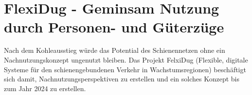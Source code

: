 \section{FlexiDug - Geminsam Nutzung durch Personen- und Güterzüge}

Nach dem Kohleausstieg würde das Potential des Schienennetzen ohne ein Nachnutzungskonzept ungenutzt bleiben. Das Projekt FelxiDug (Flexible, digitale Systeme für den schienengebundenen Verkehr in Wachstumsregionen) beschäftigt sich damit, Nachnutzungsperspektiven zu erstellen und ein solches Konzept bis zum Jahr 2024 zu erstellen.
